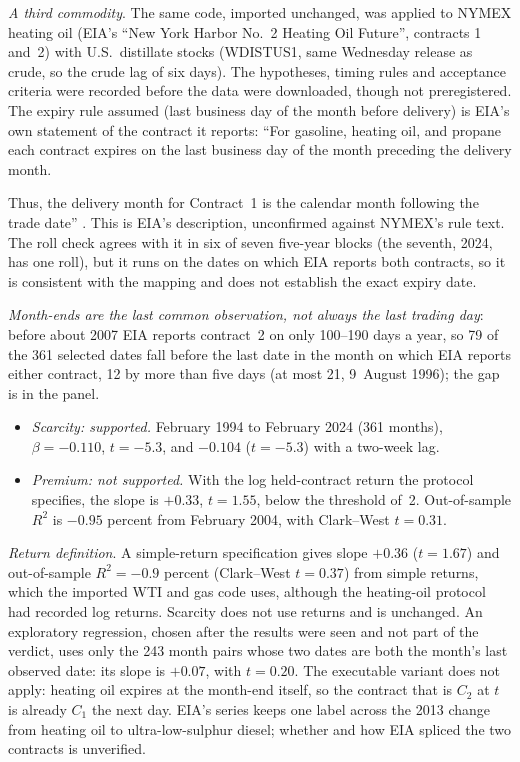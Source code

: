 \begin{qfdefinition}
\emph{A third commodity}. The same code, imported unchanged, was applied to NYMEX heating oil (EIA's ``New York Harbor No.~2 Heating Oil Future'', contracts 1 and~2) with U.S.\ distillate stocks (WDISTUS1, same Wednesday release as crude, so the crude lag of six days). The hypotheses, timing rules and acceptance criteria were recorded before the data were downloaded, though not preregistered. The expiry rule assumed (last business day of the month before delivery) is EIA's own statement of the contract it reports: ``For gasoline, heating oil, and propane each contract expires on the last business day of the month preceding the delivery month.

Thus, the delivery month for Contract~1 is the calendar month following the trade date'' \citep[Futures Prices (NYMEX), definitions, ``Contract~1'']{eia-futures-definitions}. This is EIA's description, unconfirmed against NYMEX's rule text. The roll check agrees with it in six of seven five-year blocks (the seventh, 2024, has one roll), but it runs on the dates on which EIA reports both contracts, so it is consistent with the mapping and does not establish the exact expiry date.

\emph{Month-ends are the last common observation, not always the last trading day}: before about 2007 EIA reports contract~2 on only 100--190 days a year, so 79 of the 361 selected dates fall before the last date in the month on which EIA reports either contract, 12 by more than five days (at most 21, 9~August 1996); the gap is in the panel.
\begin{itemize}
\item \emph{Scarcity: supported.} February 1994 to February 2024 (361 months), $\beta=-0.110$, $t=-5.3$, and $-0.104$ ($t=-5.3$) with a two-week lag.
\item \emph{Premium: not supported.} With the log held-contract return the protocol specifies, the slope is $+0.33$, $t=1.55$, below the threshold of~2. Out-of-sample $R^2$ is $-0.95$ percent from February 2004, with Clark--West $t=0.31$.
\end{itemize}
\emph{Return definition}. A simple-return specification gives slope $+0.36$ ($t=1.67$) and out-of-sample $R^2=-0.9$ percent (Clark--West $t=0.37$) from simple returns, which the imported WTI and gas code uses, although the heating-oil protocol had recorded log returns. Scarcity does not use returns and is unchanged. An exploratory regression, chosen after the results were seen and not part of the verdict, uses only the 243 month pairs whose two dates are both the month's last observed date: its slope is $+0.07$, with $t=0.20$.
The executable variant does not apply: heating oil expires at the month-end itself, so the contract that is $C_2$ at $t$ is already $C_1$ the next day. EIA's series keeps one label across the 2013 change from heating oil to ultra-low-sulphur diesel; whether and how EIA spliced the two contracts is unverified.


\end{qfdefinition}
